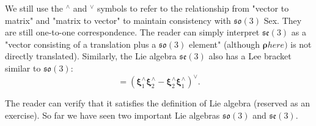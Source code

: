   We still use the $^\wedge$ and $^\vee$ symbols to refer to the relationship from "vector to matrix" and "matrix to vector" to maintain consistency with $\mathfrak{so}(3)$ Sex. They are still one-to-one correspondence. The reader can simply interpret $\mathfrak{se}(3)$ as a "vector consisting of a translation plus a $\mathfrak{so}(3)$ element" (although $\boldsymbol{\rho} here) $ is not directly translated). Similarly, the Lie algebra $\mathfrak{se}(3)$ also has a Lee bracket similar to $\mathfrak{so}(3)$:
  \begin{equation}
  [ \boldsymbol{\xi}_1, \boldsymbol{\xi}_2 ] = \left( \boldsymbol{\xi}_1^\wedge \boldsymbol{\xi}_2^\wedge -\boldsymbol{\xi}_2^ \wedge \boldsymbol{\xi}_1^\wedge \right) ^\vee.
  \end{equation}

  The reader can verify that it satisfies the definition of Lie algebra (reserved as an exercise). So far we have seen two important Lie algebras $\mathfrak{so}(3)$ and $\mathfrak{se}(3)$.
